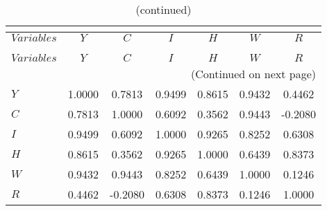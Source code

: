  
\begin{center}
\begin{longtable}{lcccccc} 
\caption{MATRIX OF CORRELATIONS}\\
 \label{Table:th_corr_matrix}\\
\toprule 
$Variables  $	 & 	 $         Y$	 & 	 $         C$	 & 	 $         I$	 & 	 $         H$	 & 	 $         W$	 & 	 $         R$\\
\midrule \endfirsthead 
\caption{(continued)}\\
 \toprule \\ 
$Variables  $	 & 	 $         Y$	 & 	 $         C$	 & 	 $         I$	 & 	 $         H$	 & 	 $         W$	 & 	 $         R$\\
\midrule \endhead 
\midrule \multicolumn{7}{r}{(Continued on next page)} \\ \bottomrule \endfoot 
\bottomrule \endlastfoot 
$Y          $	 & 	    1.0000	 & 	    0.7813	 & 	    0.9499	 & 	    0.8615	 & 	    0.9432	 & 	    0.4462 \\ 
$C          $	 & 	    0.7813	 & 	    1.0000	 & 	    0.6092	 & 	    0.3562	 & 	    0.9443	 & 	   -0.2080 \\ 
$I          $	 & 	    0.9499	 & 	    0.6092	 & 	    1.0000	 & 	    0.9265	 & 	    0.8252	 & 	    0.6308 \\ 
$H          $	 & 	    0.8615	 & 	    0.3562	 & 	    0.9265	 & 	    1.0000	 & 	    0.6439	 & 	    0.8373 \\ 
$W          $	 & 	    0.9432	 & 	    0.9443	 & 	    0.8252	 & 	    0.6439	 & 	    1.0000	 & 	    0.1246 \\ 
$R          $	 & 	    0.4462	 & 	   -0.2080	 & 	    0.6308	 & 	    0.8373	 & 	    0.1246	 & 	    1.0000 \\ 
\end{longtable}
 \end{center}
